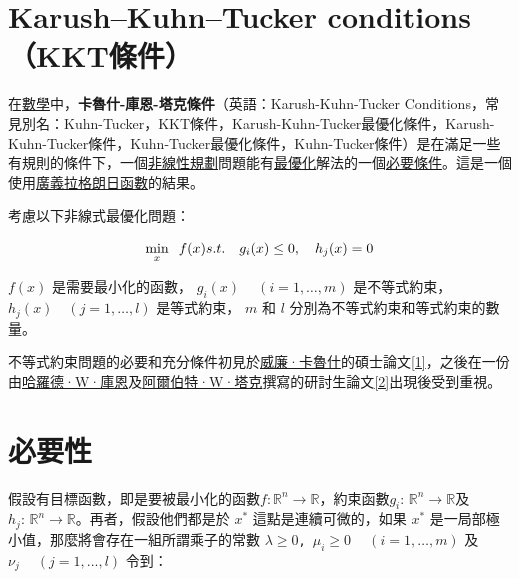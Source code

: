 \section{Karush–Kuhn–Tucker conditions （KKT條件）}

在\href{https://zh.wikipedia.org/wiki/數學}{數學}中，\textbf{卡魯什-庫恩-塔克條件}（英語：Karush-Kuhn-Tucker Conditions，常見別名：Kuhn-Tucker，KKT條件，Karush-Kuhn-Tucker最優化條件，Karush-Kuhn-Tucker條件，Kuhn-Tucker最優化條件，Kuhn-Tucker條件）是在滿足一些有規則的條件下，一個\href{https://zh.wikipedia.org/wiki/非線性規劃}{非線性規劃}問題能有\href{https://zh.wikipedia.org/wiki/最優化}{最優化}解法的一個\href{https://zh.wikipedia.org/wiki/必要條件}{必要條件}。這是一個使用\href{https://zh.wikipedia.org/wiki/广义化}{廣義}\href{https://zh.wikipedia.org/wiki/拉格朗日乘数}{拉格朗日函數}的結果。

考慮以下非線式最優化問題：

\[
{\displaystyle \min \limits _{x}\;\;f(x)} \\
s.t.\quad {\displaystyle g_{i}(x)\leq 0,\quad h_{j}(x)=0}
\]

\({\displaystyle f(x)}\) 是需要\(\textbf{最小化}\)的函數， \({\displaystyle g_{i}(x)\ \quad(i=1,\ldots ,m)}\) 是不等式約束， \({\displaystyle h_{j}(x)\quad (j=1,\ldots ,l)}\) 是等式約束， \(m\) 和 \(l\) 分別為不等式約束和等式約束的數量。

不等式約束問題的必要和充分條件初見於\href{https://zh.wikipedia.org/wiki/威廉·卡魯什}{威廉·卡魯什}的碩士論文\href{https://zh.wikipedia.org/wiki/卡鲁什-库恩-塔克条件#cite_note-1}{[1]}，之後在一份由\href{https://zh.wikipedia.org/wiki/哈羅德·W·庫恩}{哈羅德·W·庫恩}及\href{https://zh.wikipedia.org/wiki/阿尔伯特·W·塔克}{阿爾伯特·W·塔克}撰寫的研討生論文\href{https://zh.wikipedia.org/wiki/卡鲁什-库恩-塔克条件#cite_note-2}{[2]}出現後受到重視。

\section{必要性}

假設有目標函數，即是要被最小化的函數\({\displaystyle f:\mathbb {R} ^{n}\rightarrow \mathbb {R} }\)，約束函數\({\displaystyle g_{i}:\,\!\mathbb {R} ^{n}\rightarrow \mathbb {R} }\)及\({\displaystyle h_{j}:\,\!\mathbb {R} ^{n}\rightarrow \mathbb {R} }\)。再者，假設他們都是於 \(x^*\) 這點是連續可微的，如果 \(x^*\) 是一局部極小值，那麼將會存在一組所謂乘子的常數 \texttt{\({\displaystyle \lambda \geq 0}\), \({\displaystyle \mu _{i}\geq 0\ \quad (i=1,\ldots ,m)}\)} 及 \({\displaystyle \nu _{j}\ \quad (j=1,...,l)}\) 令到：


